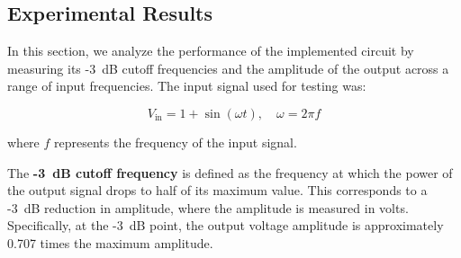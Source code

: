 \documentclass[hidelinks,12pt]{article}
\begin{document}
	
	\pagebreak
	
	\subsection{Experimental Results}
	In this section, we analyze the performance of the implemented circuit by measuring its -3~dB cutoff frequencies and the amplitude of the output across a range of input frequencies. The input signal used for testing was:
	
	\[
	V_{\text{in}} = 1 + \sin(\omega t), \quad \omega = 2\pi f
	\]
	
	where \( f \) represents the frequency of the input signal.
	
	The \textbf{-3~dB cutoff frequency} is defined as the frequency at which the power of the output signal drops to half of its maximum value. This corresponds to a -3~dB reduction in amplitude, where the amplitude is measured in volts. Specifically, at the -3~dB point, the output voltage amplitude is approximately 0.707 times the maximum amplitude.
	
\end{document}
